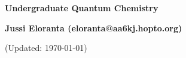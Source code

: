 \documentclass[serif]{beamer}
\begin{document}
\phantom{hauki}
\vfill
\begin{center}
\textbf{Undergraduate Quantum Chemistry}\\

\vspace{1cm}

\textbf{Jussi Eloranta (eloranta@aa6kj.hopto.org)}\\

\vspace{1cm}

{\tiny (Updated: \today)}

\end{center}
\vfill
\newpage








% 

%

%
\end{document}
